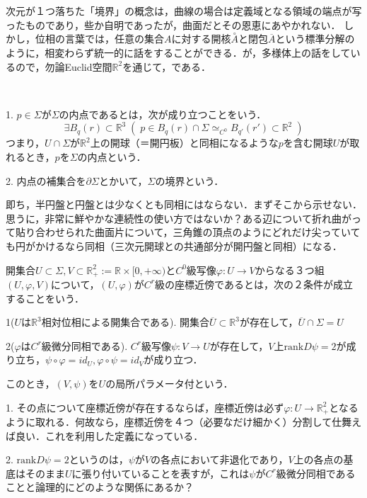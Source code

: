 \documentclass[uplatex, dvipdfmx]{jsreport}
\begin{document}
次元が１つ落ちた「境界」の概念は，曲線の場合は定義域となる領域の端点が写ったものであり，些か自明であったが，曲面だとその恩恵にあやかれない．
しかし，位相の言葉では，任意の集合$A$に対する開核$\overset{\circ}{A}$と閉包$\overline{A}$という標準分解のように，相変わらず統一的に話をすることができる．が，多様体上の話をしているので，勿論Euclid空間$\mathbb{R}^2$を通じて，である．
\begin{definition}[曲面の境界]　

    1. $p\in\Sigma$が$\Sigma$の内点であるとは，次が成り立つことをいう．
    \[ \exists B_q(r)\subset\mathbb{R}^3\; (\; p\in B_q(r)\cap \Sigma \simeq_{C^0} B_{q'}(r')\subset\mathbb{R}^2 \;) \]
    つまり，$U\cap\Sigma$が$\mathbb{R}^2$上の開球（＝開円板）と同相になるような$p$を含む開球$U$が取れるとき，$p$を$\Sigma$の内点という．

    2. 内点の補集合を$\partial\Sigma$とかいて，$\Sigma$の境界という．
\end{definition}
\begin{remark}
    即ち，半円盤と円盤とは少なくとも同相にはならない．まずそこから示せない．
    思うに，非常に鮮やかな連続性の使い方ではないか？ある辺について折れ曲がって貼り合わせられた曲面片について，三角錐の頂点のようにどれだけ尖っていても円がかけるなら同相（三次元開球との共通部分が開円盤と同相）になる．
\end{remark}

\begin{definition}[座標近傍]\label{def-coordinates-neibourhood}
    開集合$U\subset\Sigma, V\subset\mathbb{R}^2_+:=\mathbb{R}\times [0,+\infty)$と$C^0$級写像$\varphi:U\to V$からなる３つ組$(U,\varphi,V)$について，$(U,\varphi)$が$C^r$級の座標近傍であるとは，次の２条件が成立することをいう．

    1($U$は$\mathbb{R}^3$相対位相による開集合である). 開集合$\overline{U}\subset\mathbb{R}^3$が存在して，$\overline{U}\cap\Sigma= U$

    2($\varphi$は$C^r$級微分同相である). $C^r$級写像$\psi:V\to U$が存在して，$V$上$\mathrm{rank}D\psi=2$が成り立ち，$\psi\circ\varphi=id_U,\varphi\circ\psi=id_V$が成り立つ．

    このとき，$(V,\psi)$を$U$の局所パラメータ付という．
\end{definition}
\begin{remark}
    1. その点について座標近傍が存在するならば，座標近傍は必ず$\varphi:U\to\mathbb{R}^2_+$となるように取れる．何故なら，座標近傍を４つ（必要なだけ細かく）分割して仕舞えば良い．これを利用した定義になっている．

    2. $\mathrm{rank}D\psi=2$というのは，$\psi$が$V$の各点において非退化であり，$V$上の各点の基底はそのまま$U$に張り付いていることを表すが，これは$\psi$が$C^r$級微分同相であることと論理的にどのような関係にあるか？
\end{remark}
\end{document}
